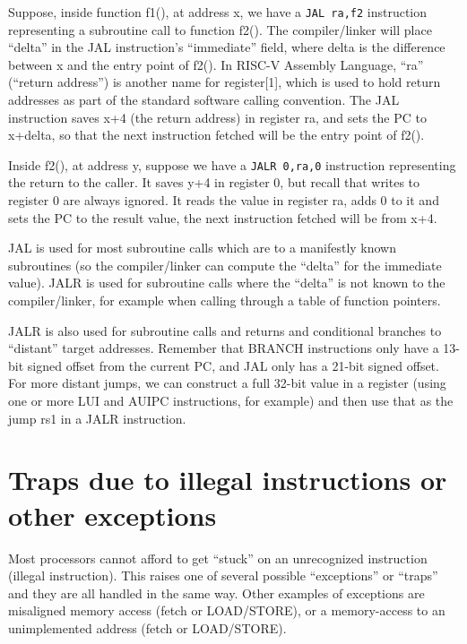 Suppose, inside function f1(), at address x, we have a {\tt JAL ra,f2}
instruction representing a subroutine call to function f2().  The
compiler/linker will place ``delta'' in the JAL instruction's
``immediate'' field, where delta is the difference between x and the
entry point of f2().  In RISC-V Assembly Language, ``ra'' (``return
address'') is another name for register[1], which is used to hold
return addresses as part of the standard software calling convention.
The JAL instruction saves x+4 (the return address) in register ra, and
sets the PC to x+delta, so that the next instruction fetched will be
the entry point of f2().

Inside f2(), at address y, suppose we have a {\tt JALR 0,ra,0}
instruction representing the return to the caller.  It saves y+4 in
register 0, but recall that writes to register 0 are always ignored.
It reads the value in register ra, adds 0 to it and sets the PC to the
result value, {\ie} the next instruction fetched will be from x+4.

JAL is used for most subroutine calls which are to a manifestly known
subroutines (so the compiler/linker can compute the ``delta'' for the
immediate value).  JALR is used for subroutine calls where the
``delta'' is not known to the compiler/linker, for example when
calling through a table of function pointers.

JALR is also used for subroutine calls and returns and conditional
branches to ``distant'' target addresses.  Remember that BRANCH
instructions only have a 13-bit signed offset from the current PC, and
JAL only has a 21-bit signed offset.  For more distant jumps, we can
construct a full 32-bit value in a register (using one or more LUI and
AUIPC instructions, for example) and then use that as the jump rs1 in
a JALR instruction.


\section{Traps due to illegal instructions or other exceptions}

Most processors cannot afford to get ``stuck'' on an unrecognized
instruction (illegal instruction).  This raises one of several
possible ``exceptions'' or ``traps'' and they are all handled in the
same way.  Other examples of exceptions are misaligned memory access
(fetch or LOAD/STORE), or a memory-access to an unimplemented address
(fetch or LOAD/STORE).

